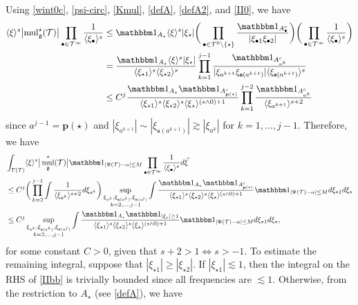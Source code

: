 \documentclass[%
11pt,  reqno]{amsart}
\newcommand{\jap}[1]{\langle #1 \rangle}
\newcommand{\5}{\textup{V}}
\newcommand{\ind}{\mathbbm 1}
\newcommand{\les}{\lesssim}
\theoremstyle{remark}
\newcommand{\bul}{\bullet}
\newcommand{\TT}{\mathcal{T}}
\newcommand{\al}{\alpha}
\newcommand{\G}{\Gamma}
\newcommand{\gfrak}{\mathfrak{g}}
\newcommand{\pb}{\mathbf{p}}
\newcommand{\sbf}{\mathbf{s}}
\newcommand{\ges}{\gtrsim}
\newcommand{\jb}[1]
{\langle #1 \rangle}
\DeclareMathOperator{\mul}{mul}
\numberwithin{equation}{section}
\numberwithin{theorem}{section}
\begin{document}
Using \eqref{wint0c}, \eqref{psi-circ}, \eqref{Kmul}, \eqref{defA}, \eqref{defA2}, and \eqref{II0}, we have
\begin{align}
	\jap{\xi}^s \big| {\mul}_\gfrak^\star(\TT) \big|  \prod_{\bul\in \TT^\infty} \frac{1}{\jap{\xi_\bul}^s} 
&
\le 
\ind_{A_\star} \jb{\xi}^s |\xi_{\star} | \bigg( \prod_{\bul\in\TT^0 \setminus\{\star\}} \frac{\ind_{A_\bul^c}}{ |\xi_{\bul1} \xi_{\bul2} | } \bigg) \bigg( \prod_{\bul \in \TT^\infty} \frac{1}{\jb{\xi_\bul}^s} \bigg)
\\
&
= 
\frac{\ind_{A_\star} \jb{\xi}^s |\xi_{\star}|}{\jb{\xi_{\star1}}^s \jb{\xi_{\star2}}^s} \prod_{k=1}^{j-1} \frac{\ind_{A^c_{a^{k}}}}{ |\xi_{a^{k+1}} \xi_{\sbf(a^{k+1})} | \jb{\xi_{\sbf(a^{k+1})}}^s}
\\
&
\le C^j \frac{\ind_{A_\star} \ind_{A^c_{\pb(\star)}}  }{ \jb{\xi_{\star1} }^s \jb{\xi_{\star2}}^s  \jb{\xi_{\star}}^{(s\land0)+1} } \prod_{k=1}^{j-2} \frac{\ind_{A^c_{a^{k}}}}{ \jb{\xi_{a^{k+1}}}^{s+2}}
\end{align}
since $a^{j-1} = \pb(\star)$ and $|\xi_{a^{k+1}}| \sim |\xi_{\sbf(a^{k+1})}| \ges |\xi_{a^{k}}|$ for $k=1, \ldots, j-1$. 
%
%
Therefore, we have
\begin{align}
\label{IIbb}
\begin{split}
&
\int_{\G(\TT)} \jb{\xi}^s \big| \mul_{\gfrak}^\star(\TT) \big| \ind_{|\Psi(\TT)-\al| \le  M} \prod_{\bul\in\TT^\infty} \frac{1}{\jb{\xi_\bul}^s} d\vec\xi 
\\
&
\le C^j \bigg( \prod_{k=2}^{j-1} \int \frac{1}{ \jb{\xi_{a^{k}}}^{s+2} } d\xi_{a^k} \bigg) \sup_{\substack{\xi_{a^k}, \xi_{\sbf(a^k)}, \xi_{\sbf(a^{j})} \\ k=2, \ldots, j-1}}
\int \frac{\ind_{A_\star} \ind_{A^c_{\pb(\star)}}}{ \jb{\xi_{\star1} }^s \jb{\xi_{\star2}}^s \jb{\xi_\star}^{(s\land0)+1}  } \ind_{|\Psi(\TT) - \al| \le M} d\xi_{\star1} d\xi_{\star} 
\\
&
\le C^j 
\sup_{\substack{\xi_{a^k}, \xi_{\sbf(a^k)}, \xi_{\sbf(a^{j})} \\ k=2, \ldots, j-1}}
\int \frac{\ind_{A_\star} \ind_{|\xi_\star|\ge 1}}{ \jb{\xi_{\star1} }^s \jb{\xi_{\star2}}^s \jb{\xi_\star}^{(s\land0)+1}  } \ind_{|\Psi(\TT) - \al| \le M} d\xi_{\star1} d\xi_{\star} , 
\end{split}
\end{align}
for some constant $C>0$, given that $s+2>1 \iff s>-1$. 
To estimate the remaining integral, suppose that
$|\xi_{\star1} | \ge |\xi_{\star2}|$.
If $|\xi_{\star1}| \les 1$, then the integral on the RHS of \eqref{IIbb} is trivially bounded since all frequencies are $\les 1$. Otherwise, from the restriction to $A_\star$ (see \eqref{defA}), we have 
\end{document}
